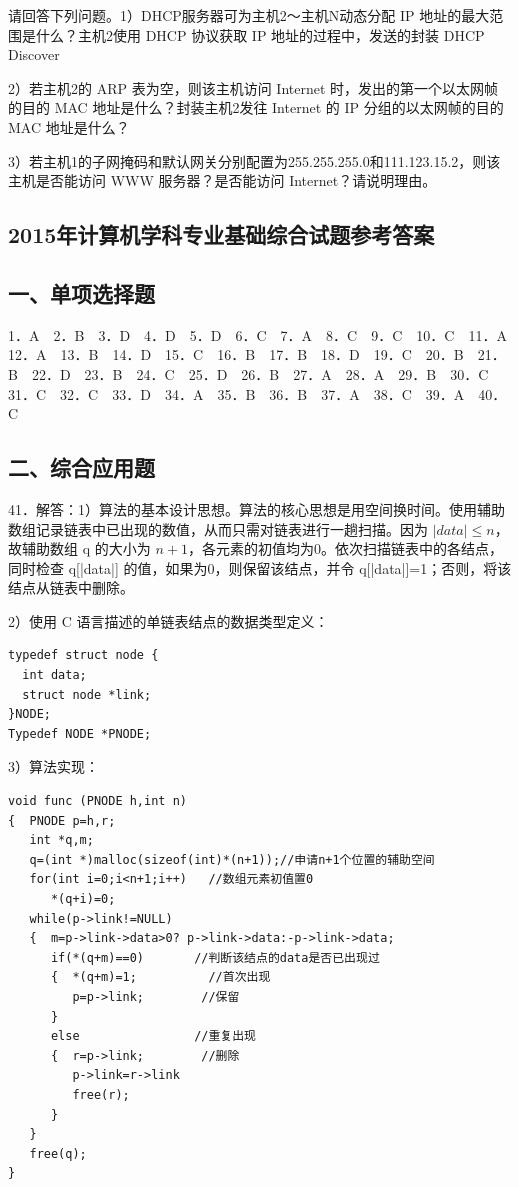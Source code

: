 \documentclass[UTF8,11pt]{ctexart}
\begin{document}
请回答下列问题。1）DHCP服务器可为主机2～主机N动态分配 IP 地址的最大范围是什么？主机2使用 DHCP 协议获取 IP 地址的过程中，发送的封装 DHCP Discover


2）若主机2的 ARP 表为空，则该主机访问 Internet 时，发出的第一个以太网帧的目的 MAC 地址是什么？封装主机2发往 Internet 的 IP 分组的以太网帧的目的 MAC 地址是什么？


3）若主机1的子网掩码和默认网关分别配置为255.255.255.0和111.123.15.2，则该主机是否能访问 WWW 服务器？是否能访问 Internet？请说明理由。


\subsection*{2015年计算机学科专业基础综合试题参考答案}

\subsection*{一、单项选择题}

1．A　2．B　3．D　4．D　5．D　6．C　7．A　8．C　9．C　10．C　11．A　12．A　13．B　14．D　15．C　16．B　17．B　18．D　19．C　20．B　21．B　22．D　23．B　24．C　25．D　26．B　27．A　28．A　29．B　30．C　31．C　32．C　33．D　34．A　35．B　36．B　37．A　38．C　39．A　40．C


\subsection*{二、综合应用题}

41．解答：1）算法的基本设计思想。算法的核心思想是用空间换时间。使用辅助数组记录链表中已出现的数值，从而只需对链表进行一趟扫描。因为 \(\displaystyle |data|\le n\)，故辅助数组 q 的大小为 \(\displaystyle n+1\)，各元素的初值均为0。依次扫描链表中的各结点，同时检查 q[|data|] 的值，如果为0，则保留该结点，并令 q[|data|]=1；否则，将该结点从链表中删除。


2）使用 C 语言描述的单链表结点的数据类型定义：


\begin{Verbatim}[breaklines,breakanywhere,fontsize=\small]
typedef struct node {
  int data;
  struct node *link;
}NODE;
Typedef NODE *PNODE;
\end{Verbatim}

3）算法实现：


\begin{Verbatim}[breaklines,breakanywhere,fontsize=\small]
void func (PNODE h,int n)
{  PNODE p=h,r;
   int *q,m;
   q=(int *)malloc(sizeof(int)*(n+1));//申请n+1个位置的辅助空间
   for(int i=0;i<n+1;i++)   //数组元素初值置0
      *(q+i)=0;
   while(p->link!=NULL)
   {  m=p->link->data>0? p->link->data:-p->link->data;
      if(*(q+m)==0)       //判断该结点的data是否已出现过
      {  *(q+m)=1;          //首次出现
         p=p->link;        //保留
      }
      else                //重复出现
      {  r=p->link;        //删除
         p->link=r->link
         free(r);
      }
   }
   free(q);
}
\end{Verbatim}
\end{document}
